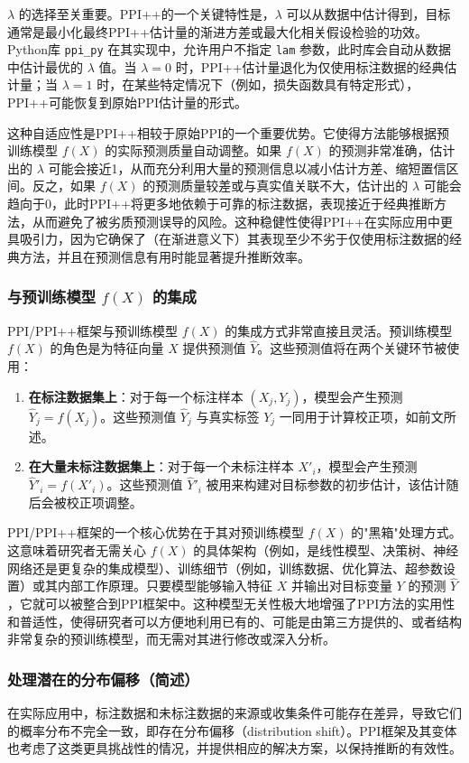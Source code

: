 \documentclass[12pt,a4paper]{article}
\begin{document}
$\lambda$ 的选择至关重要。PPI++的一个关键特性是，$\lambda$ 可以从数据中估计得到，目标通常是最小化最终PPI++估计量的渐进方差或最大化相关假设检验的功效。Python库 \texttt{ppi\_py} 在其实现中，允许用户不指定 \texttt{lam} 参数，此时库会自动从数据中估计最优的 $\lambda$ 值。当 $\lambda=0$ 时，PPI++估计量退化为仅使用标注数据的经典估计量；当 $\lambda=1$ 时，在某些特定情况下（例如，损失函数具有特定形式），PPI++可能恢复到原始PPI估计量的形式。

这种自适应性是PPI++相较于原始PPI的一个重要优势。它使得方法能够根据预训练模型 $f(X)$ 的实际预测质量自动调整。如果 $f(X)$ 的预测非常准确，估计出的 $\lambda$ 可能会接近1，从而充分利用大量的预测信息以减小估计方差、缩短置信区间。反之，如果 $f(X)$ 的预测质量较差或与真实值关联不大，估计出的 $\lambda$ 可能会趋向于0，此时PPI++将更多地依赖于可靠的标注数据，表现接近于经典推断方法，从而避免了被劣质预测误导的风险。这种稳健性使得PPI++在实际应用中更具吸引力，因为它确保了（在渐进意义下）其表现至少不劣于仅使用标注数据的经典方法，并且在预测信息有用时能显著提升推断效率。

\subsubsection{与预训练模型 $f(X)$ 的集成}
\label{sec:integration_with_fX}
PPI/PPI++框架与预训练模型 $f(X)$ 的集成方式非常直接且灵活。预训练模型 $f(X)$ 的角色是为特征向量 $X$ 提供预测值 $\hat{Y}$。这些预测值将在两个关键环节被使用：
\begin{enumerate}
    \item \textbf{在标注数据集上}：对于每一个标注样本 $(X_j,Y_j)$，模型会产生预测 $\hat{Y}_j=f(X_j)$。这些预测值 $\hat{Y}_j$ 与真实标签 $Y_j$ 一同用于计算校正项，如前文所述。
    \item \textbf{在大量未标注数据集上}：对于每一个未标注样本 $X'_i$，模型会产生预测 $\hat{Y}'_i=f(X'_i)$。这些预测值 $\hat{Y}'_i$ 被用来构建对目标参数的初步估计，该估计随后会被校正项调整。
\end{enumerate}
PPI/PPI++框架的一个核心优势在于其对预训练模型 $f(X)$ 的"黑箱"处理方式。这意味着研究者无需关心 $f(X)$ 的具体架构（例如，是线性模型、决策树、神经网络还是更复杂的集成模型）、训练细节（例如，训练数据、优化算法、超参数设置）或其内部工作原理。只要模型能够输入特征 $X$ 并输出对目标变量 $Y$ 的预测 $\hat{Y}$，它就可以被整合到PPI框架中。这种模型无关性极大地增强了PPI方法的实用性和普适性，使得研究者可以方便地利用已有的、可能是由第三方提供的、或者结构非常复杂的预训练模型，而无需对其进行修改或深入分析。

\subsubsection{处理潜在的分布偏移（简述）}
\label{sec:distribution_shift}
\indent 在实际应用中，标注数据和未标注数据的来源或收集条件可能存在差异，导致它们的概率分布不完全一致，即存在分布偏移（distribution shift）。PPI框架及其变体也考虑了这类更具挑战性的情况，并提供相应的解决方案，以保持推断的有效性。
\end{document}

